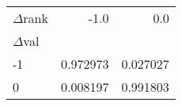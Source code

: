 \begin{tabular}{lrr}
\toprule
$\Delta$rank &      -1.0 &       0.0 \\
$\Delta$val &           &           \\
\midrule
-1        &  0.972973 &  0.027027 \\
 0        &  0.008197 &  0.991803 \\
\bottomrule
\end{tabular}

